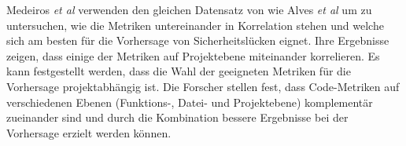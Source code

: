 Medeiros \emph{et al} \cite{medeiros_et_al} verwenden den gleichen Datensatz von wie Alves \emph{et al} \cite{alves_et_al} um zu untersuchen, wie die Metriken untereinander in Korrelation stehen und welche sich am besten für die Vorhersage von Sicherheitslücken eignet.
Ihre Ergebnisse zeigen, dass einige der Metriken auf Projektebene miteinander korrelieren.
Es kann festgestellt werden, dass die Wahl der geeigneten Metriken für die Vorhersage projektabhängig ist.
Die Forscher stellen fest, dass Code-Metriken auf verschiedenen Ebenen (Funktions-, Datei- und Projektebene) komplementär zueinander sind und durch die Kombination bessere Ergebnisse bei der Vorhersage erzielt werden können.
